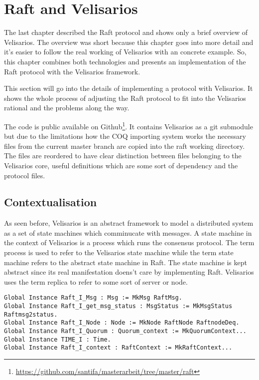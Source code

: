 %
\section{Raft and Velisarios}
\label{sec_4}

The last chapter described the Raft protocol and shows
only a brief overview of Velisarios. The overview was
short because this chapter goes into more detail
and it's easier to follow the real working of Velisarios
with an concrete example. So, this chapter combines both
technologies and presents an implementation of the Raft
protocol with the Velisarios framework.

This section will go into the details of implementing a protocol
with Velisarios. It shows the whole process of adjusting the Raft
protocol to fit into the Velisarios rational and the problems
along the way. 

The code is public available on
Github\footnote{\url{https://github.com/santifa/masterarbeit/tree/master/raft}}.
It contains Velisarios as a git submodule but due to the limitations how
the COQ importing system works the necessary files from the current
master branch are copied into the raft working directory. The files
are reordered to have clear distinction between files belonging to
the Velisarios core, useful definitions which are some sort of dependency
and the protocol files.

\subsection{Contextualisation}
As seen before, Velisarios is an abstract framework to model
a distributed system as a set of state machines which comminucate
with messages. A state machine in the context of Velisarios is
a process which runs the consensus protocol. The term process is used
to refer to the Velisarios state machine while the term state
machine refers to the abstract state machine in Raft. The state
machine is kept abstract since its real manifestation doens't care
by implementing Raft. Velisarios uses the term replica to refer
to some sort of server or node.

\begin{lstlisting}[style=coq,label=lst:abs,
caption=Abstract typeclasses used by Velisarios.]
Global Instance Raft_I_Msg : Msg := MkMsg RaftMsg.
Global Instance Raft_I_get_msg_status : MsgStatus := MkMsgStatus Raftmsg2status.
Global Instance Raft_I_Node : Node := MkNode RaftNode RaftnodeDeq.
Global Instance Raft_I_Quorum : Quorum_context := MkQuorumContext...
Global Instance TIME_I : Time.
Global Instance Raft_I_context : RaftContext := MkRaftContext...
\end{lstlisting}

